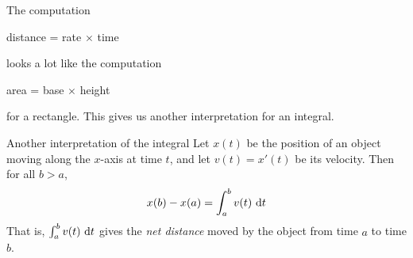 \begin{frame}
\begin{center}
\end{center}

The computation 
\begin{center}
distance = rate $\times$ time
\end{center}

looks a lot like the computation

\begin{center}
area = base $\times$ height
\end{center}

for a rectangle. This gives us another interpretation for an integral.
\end{frame}
\begin{frame}{Another interpretation of the integral}
Let $x(t)$ be the position of an object moving along the $x$-axis at time $t$, and let $v(t) = x'(t)$ be its velocity. Then for all $b>a$,
\[x(b)-x(a) = \int_a^b v(t)~\text{d} t\]
That is, $\int_a^b v(t)~\text{d} t$ gives the \textit{net distance} moved by the object from time $a$ to time $b$.
\end{frame}
